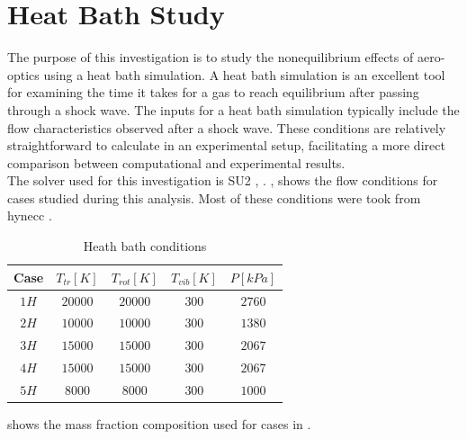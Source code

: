 \section{Heat Bath Study\label{ch4:heatBathStudy}}
The purpose of this investigation is to study the nonequilibrium effects of
aero-optics using a heat bath simulation. A heat bath simulation is an
excellent tool for examining the time it takes for a gas to reach equilibrium
after passing through a shock wave. The inputs for a heat bath simulation
typically include the flow characteristics observed after a shock wave. These
conditions are relatively straightforward to calculate in an experimental
setup, facilitating a more direct comparison between computational and
experimental results. \\

The solver used for this investigation is \gls{SU2} \cite{Palacios2013},
\cite{Palacios2013a}. , shows the flow conditions for
cases studied during this analysis. Most of these conditions were took from
\gls{hynecc} \cite{Gimelshein2022}. 

\begin{table}[H]
    \begin{center}
        \begin{tabular}{|c|c|c|c|c|}
        \hline
         Case & $T_{tr}\left[K\right]$ & $T_{rot}\left[K\right]$ &
            $T_{vib}\left[K\right]$ &  $P\left[kPa\right]$ \\ \hline\hline
            $1H$\cite{Gimelshein2022} & $20000$ & $20000$ & $300$ &  $2760$ \\ \hline 
            $2H$\cite{Gimelshein2022} & $10000$ & $10000$ & $300$ & $1380$ \\ \hline 
            $3H$\cite{Gimelshein2022} & $15000$ & $15000$ & $300$ & $2067$ \\
            \hline
            $4H$\cite{Gimelshein2022} & $15000$ & $15000$ & $300$ & $2067$\\
            \hline
            $5H$  & $8000$ & $8000$ & $300$ & $1000$ \\ \hline
        \end{tabular}
        \caption{Heath bath conditions\label{tab:heatBathStudy}}
    \end{center}
\end{table}

     shows the mass fraction composition used for
    cases in . 

